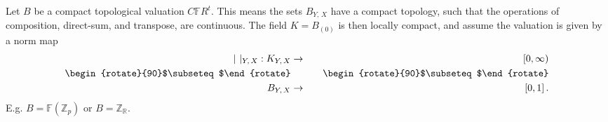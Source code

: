 \documentclass[leqno]{article}
\numberwithin{equation}{section}
\begin{document}
Let $B$ be a compact topological valuation $C{\mathbb F} R^t$. This means the sets $B_{Y, \, X}$ have a compact topology, such that the operations of composition, direct-sum, and transpose, are continuous. The field $K = B_{(0)}$ is then locally compact, and assume the valuation is given by a norm map
\begin{eqnarray}
\label{eq58}
\vert \ \vert_{Y, \, X} : K_{Y, \, X} &\to &[0,\infty) \\
\mbox{\begin{rotate}{90}$\subseteq$\end{rotate}} &&\quad\mbox{\begin{rotate}{90}$\subseteq$\end{rotate}} \nonumber \\
B_{Y, \, X} &\to &[0,1] \, . \nonumber
\end{eqnarray}
E.g. $B = {\mathbb F} ({\mathbb Z}_p)$ or $B = {\mathbb Z}_{\mathbb R}$.

\smallskip
\end{document}
